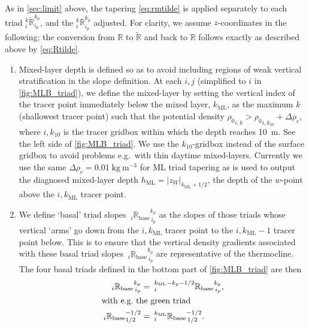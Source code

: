 \documentclass[../main/NEMO_manual]{subfiles}
\begin{document}
As in \autoref{sec:limit} above, the tapering \autoref{eq:rmtilde} is applied separately to
each triad $_i^k\tilde{\mathbb{R}}_{i_p}^{k_p}$, and the $_i^k\mathbb{R}_{i_p}^{k_p}$ adjusted.
For clarity, we assume $z$-coordinates in the following;
the conversion from $\mathbb{R}$ to $\tilde{\mathbb{R}}$ and back to $\mathbb{R}$ follows exactly as
described above by \autoref{eq:Rtilde}.
\begin{enumerate}
\item
  Mixed-layer depth is defined so as to avoid including regions of weak vertical stratification in
  the slope definition.
  At each $i,j$ (simplified to $i$ in \autoref{fig:MLB_triad}),
  we define the mixed-layer by setting the vertical index of the tracer point immediately below the mixed layer,
  $k_{\mathrm{ML}}$, as the maximum $k$ (shallowest tracer point) such that
  the potential density ${\rho_0}_{i,k}>{\rho_0}_{i,k_{10}}+\Delta\rho_c$,
  where $i,k_{10}$ is the tracer gridbox within which the depth reaches 10~m.
  See the left side of \autoref{fig:MLB_triad}.
  We use the $k_{10}$-gridbox instead of the surface gridbox to avoid problems e.g.\ with thin daytime mixed-layers.
  Currently we use the same $\Delta\rho_c=0.01\;\mathrm{kg\:m^{-3}}$ for ML triad tapering as is used to
  output the diagnosed mixed-layer depth $h_{\mathrm{ML}}=|z_{W}|_{k_{\mathrm{ML}}+1/2}$,
  the depth of the $w$-point above the $i,k_{\mathrm{ML}}$ tracer point.
\item
  We define `basal' triad slopes ${\:}_i{\mathbb{R}_{\mathrm{base}}}_{\,i_p}^{k_p}$ as
  the slopes of those triads whose vertical `arms' go down from the $i,k_{\mathrm{ML}}$ tracer point to
  the $i,k_{\mathrm{ML}}-1$ tracer point below.
  This is to ensure that the vertical density gradients associated with
  these basal triad slopes ${\:}_i{\mathbb{R}_{\mathrm{base}}}_{\,i_p}^{k_p}$ are representative of the thermocline.
  The four basal triads defined in the bottom part of \autoref{fig:MLB_triad} are then
  \begin{align*}
    {\:}_i{\mathbb{R}_{\mathrm{base}}}_{\,i_p}^{k_p} &=
                                                       {\:}^{k_{\mathrm{ML}}-k_p-1/2}_i{\mathbb{R}_{\mathrm{base}}}_{\,i_p}^{k_p},
    \\
    \intertext{with e.g.\ the green triad}
    {\:}_i{\mathbb{R}_{\mathrm{base}}}_{1/2}^{-1/2}&=
                                                     {\:}^{k_{\mathrm{ML}}}_i{\mathbb{R}_{\mathrm{base}}}_{\,1/2}^{-1/2}.
  \end{align*}

\end{enumerate}
\end{document}
